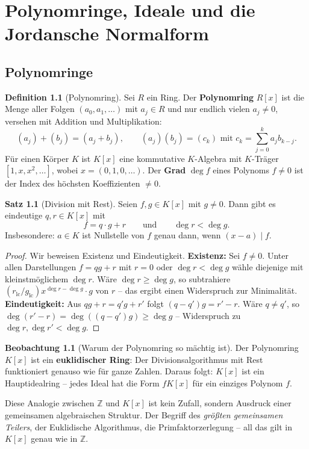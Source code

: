 ﻿\documentclass[a4paper,12pt]{report}
\theoremstyle{definition}
\newtheorem{definition}{Definition}
\newtheorem{satz}{Satz}
\newtheorem{beobachtung}{Beobachtung}
\begin{document}
\chapter{Polynomringe, Ideale und die Jordansche Normalform}

\section{Polynomringe}

\begin{definition}[Polynomring]
    Sei $R$ ein Ring. Der \textbf{Polynomring} $R[x]$ ist die Menge
    aller Folgen $(a_0, a_1, \dots)$ mit $a_j \in R$ und nur endlich
    vielen $a_j \neq 0$, versehen mit Addition und Multiplikation:
    \[
        (a_j) + (b_j) = (a_j + b_j), \qquad
        (a_j)(b_j) = (c_k) \text{ mit } c_k = \sum_{j=0}^k a_j b_{k-j}.
    \]
    Für einen Körper $K$ ist $K[x]$ eine kommutative $K$-Algebra
    mit $K$-Träger $[1, x, x^2, \dots]$, wobei $x = (0,1,0,\dots)$.
    Der \textbf{Grad} $\deg f$ eines Polynoms $f \neq 0$ ist der
    Index des höchsten Koeffizienten $\neq 0$.
\end{definition}

\begin{satz}[Division mit Rest]
    Seien $f, g \in K[x]$ mit $g \neq 0$. Dann gibt es eindeutige
    $q, r \in K[x]$ mit
    \[
        f = q \cdot g + r \qquad \text{und} \qquad \deg r < \deg g.
    \]
    Insbesondere: $a \in K$ ist Nullstelle von $f$ genau dann, wenn
    $(x - a) \mid f$.
\end{satz}
\begin{proof}
    Wir beweisen Existenz und Eindeutigkeit.
    \textbf{Existenz:} Sei $f \neq 0$. Unter allen Darstellungen $f = qg + r$ mit
    $r = 0$ oder $\deg r < \deg g$ wähle diejenige mit kleinstmöglichem $\deg r$.
    Wäre $\deg r \geq \deg g$, so subtrahiere $(r_{\mathrm{lc}}/g_{\mathrm{lc}}) x^{\deg r - \deg g} \cdot g$
    von $r$ -- das ergibt einen Widerspruch zur Minimalität.
    \textbf{Eindeutigkeit:} Aus $qg + r = q'g + r'$ folgt $(q-q')g = r' - r$.
    Wäre $q \neq q'$, so $\deg(r' - r) = \deg((q-q')g) \geq \deg g$ -- Widerspruch
    zu $\deg r, \deg r' < \deg g$.
\end{proof}


\begin{beobachtung}[Warum der Polynomring so mächtig ist]
    Der Polynomring $K[x]$ ist ein \textbf{euklidischer Ring}: Der
    Divisionsalgorithmus mit Rest funktioniert genauso wie für ganze
    Zahlen. Daraus folgt: $K[x]$ ist ein Hauptidealring -- jedes
    Ideal hat die Form $f K[x]$ für ein einziges Polynom $f$.

    Diese Analogie zwischen $\mathbb{Z}$ und $K[x]$ ist kein Zufall,
    sondern Ausdruck einer gemeinsamen algebraischen Struktur. Der
    Begriff des \emph{größten gemeinsamen Teilers}, der Euklidische
    Algorithmus, die Primfaktorzerlegung -- all das gilt in $K[x]$
    genau wie in $\mathbb{Z}$.
\end{beobachtung}
\end{document}
